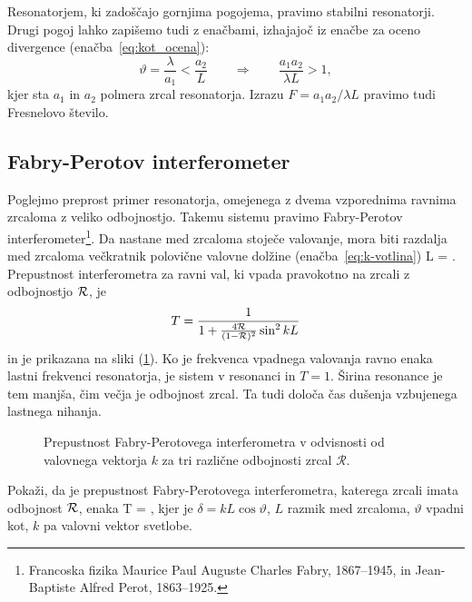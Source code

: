Resonatorjem, ki zadoščajo gornjima pogojema, pravimo stabilni resonatorji.
Drugi pogoj lahko zapišemo tudi z enačbami, izhajajoč iz enačbe za oceno divergence (enačba~\ref{eq:kot_ocena}):
\begin{equation}
\vartheta = \frac{\lambda}{a_1} < \frac{a_2}{L} \qquad \Rightarrow \qquad
\frac{a_{1}a_{2}}{\lambda L}>1,
\label{eq:Fresnelovo_stevilo}
\end{equation}
kjer sta $a_{1}$ in $a_{2}$ polmera zrcal resonatorja. Izrazu 
$
F = a_{1}a_{2}/\lambda L
$
pravimo tudi Fresnelovo število.

\subsection*{Fabry-Perotov interferometer}
Poglejmo preprost primer resonatorja, omejenega z dvema vzporednima ravnima zrcaloma
z veliko odbojnostjo. Takemu sistemu pravimo Fabry-Perotov 
interferometer\footnote{Francoska fizika Maurice Paul Auguste Charles Fabry, 1867--1945, in 
Jean-Baptiste Alfred Perot, 1863--1925.}. 
Da nastane med zrcaloma stoječe valovanje, mora biti razdalja 
med zrcaloma večkratnik polovične valovne dolžine (enačba~\ref{eq:k-votlina})
\beq
L = .
\eeq
Prepustnost interferometra za ravni val, ki vpada pravokotno na zrcali z
odbojnostjo ${\cal R}$, je 
\begin{equation}
T=\frac{1}{1+\frac{4{\cal R}}{(1-{\cal R})^{2}}\sin^{2}kL}
\label{eq:Fabry-Perot-prepustnost}
\end{equation}
in je prikazana na sliki (\ref{fig:Fabry-Perot}).
Ko je frekvenca vpadnega valovanja ravno enaka lastni frekvenci
resonatorja, je sistem v resonanci in  $T=1$. Širina resonance je tem manjša, čim
večja je odbojnost zrcal. Ta tudi določa čas dušenja vzbujenega
lastnega nihanja.\\
\begin{figure}[h]
\centering
\def\svgwidth{100truemm} 

\caption{
Prepustnost Fabry-Perotovega interferometra
v odvisnosti od valovnega vektorja $k$ za tri različne odbojnosti zrcal
$\mathcal{R}.$}
\label{fig:Fabry-Perot}
\end{figure}

\begin{definition}
Pokaži, da je prepustnost Fabry-Perotovega interferometra, katerega zrcali imata odbojnost $\cal{R}$, enaka 
\beq
T = ,
\eeq
kjer je $\delta = kL\cos{\vartheta}$, $L$ razmik med zrcaloma, $\vartheta$ vpadni kot, 
$k$ pa valovni vektor svetlobe.
\end{definition}

